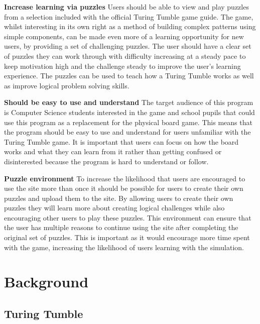 \documentclass{l4proj}
\begin{document}
\textbf{Increase learning via puzzles} Users should be able to view and play puzzles from a selection included with the official Turing Tumble game guide. The game, whilst interesting in its own right as a method of building complex patterns using simple components, can be made even more of a learning opportunity for new users, by providing a set of challenging puzzles. The user should have a clear set of puzzles they can work through with difficulty increasing at a steady pace to keep motivation high and the challenge steady to improve the user's learning experience. The puzzles can be used to teach how a Turing Tumble works as well as improve logical problem solving skills.    

\textbf{Should be easy to use and understand} The target audience of this program is Computer Science students interested in the game and school pupils that could use this program as a replacement for the physical board game. This means that the program should be easy to use and understand for users unfamiliar with the Turing Tumble game. It is important that users can focus on how the board works and what they can learn from it rather than getting confused or disinterested because the program is hard to understand or follow. 

\textbf{Puzzle environment} To increase the likelihood that users are encouraged to use the site more than once it should be possible for users to create their own puzzles and upload them to the site. By allowing users to create their own puzzles they will learn more about creating logical challenges while also encouraging other users to play these puzzles. This environment can ensure that the user has multiple reasons to continue using the site after completing the original set of puzzles. This is important as it would encourage more time spent with the game, increasing the likelihood of users learning with the simulation. 

\chapter{Background}
\section{Turing Tumble}
\label{section:background}
\end{document}
